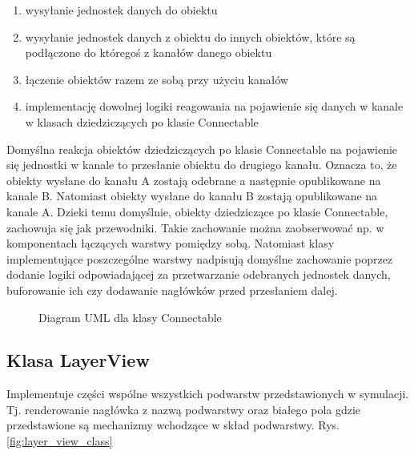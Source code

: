 \begin{enumerate}
	\item wysyłanie jednostek danych do obiektu
	\item wysyłanie jednostek danych z obiektu do innych obiektów, które są podłączone do któregoś z kanałów danego obiektu
	\item łączenie obiektów razem ze sobą przy użyciu kanałów
	\item implementację dowolnej logiki reagowania na pojawienie się danych w kanale w klasach dziedziczących po klasie Connectable
\end{enumerate}

Domyślna reakcja obiektów dziedziczących po klasie Connectable na pojawienie się jednostki w kanale to przesłanie obiektu do drugiego kanału. Oznacza to, że obiekty wysłane do kanału A zostają odebrane a następnie opublikowane na kanale B. Natomiast obiekty wysłane do kanału B zostają opublikowane na kanale A. Dzieki temu domyślnie, obiekty dziedziczące po klasie Connectable, zachowuja się jak przewodniki. Takie zachowanie można zaobserwować np. w komponentach łączących warstwy pomiędzy sobą. Natomiast klasy implementujące poszczególne warstwy nadpisują domyślne zachowanie poprzez dodanie logiki odpowiadającej za przetwarzanie odebranych jednostek danych, buforowanie ich czy dodawanie nagłówków przed przesłaniem dalej.

\begin{figure}[ht]
	\centerline{}
	\caption{Diagram UML dla klasy Connectable}
	\label{fig:connectable_class}
\end{figure}

\subsection{Klasa LayerView}

Implementuje części wspólne wszystkich podwarstw przedstawionych w symulacji. Tj. renderowanie nagłówka z nazwą podwarstwy oraz białego pola gdzie przedstawione są mechanizmy wchodzące w skład podwarstwy. Rys. \ref{fig:layer_view_class}


